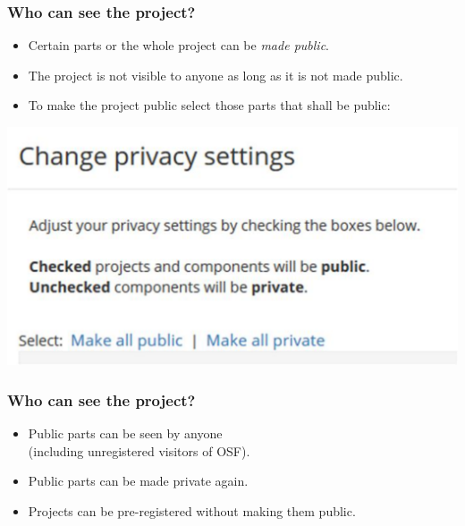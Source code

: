 \documentclass{beamer}
\begin{document}
\begin{frame}
\frametitle{Who can see the project?}
\begin{itemize}
	\item Certain parts or the whole project can be \textit{made public}.
	\item The project is not visible to anyone as long as it is not made public.
	\item To make the project public select those parts that shall be public:
\end{itemize}
\begin{center}
\includegraphics[scale=0.4]{prereg3.pdf}
\end{center}
\end{frame}

\begin{frame}
\frametitle{Who can see the project?}
\begin{itemize}
	\item Public parts can be seen by anyone \\ (including unregistered visitors of OSF).
	\item Public parts can be made private again.
 	\item Projects can be pre-registered without making them public.
\end{itemize}

\end{frame}
\end{document}
